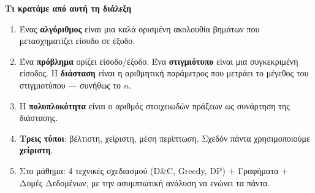 \documentclass[11pt,a4paper]{article}
\begin{document}
\begin{recapbox}
\textbf{Τι κρατάμε από αυτή τη διάλεξη}
\begin{enumerate}
  \item Ένας \textbf{αλγόριθμος} είναι μια καλά ορισμένη ακολουθία βημάτων που
  μετασχηματίζει είσοδο σε έξοδο.
  \item Ένα \textbf{πρόβλημα} ορίζει είσοδο/έξοδο. Ένα \textbf{στιγμιότυπο} είναι
  μια συγκεκριμένη είσοδος. Η \textbf{διάσταση} είναι η αριθμητική παράμετρος που
  μετράει το μέγεθος του στιγμιοτύπου --- συνήθως το $n$.
  \item Η \textbf{πολυπλοκότητα} είναι ο αριθμός στοιχειωδών πράξεων ως συνάρτηση
  της διάστασης.
  \item \textbf{Τρεις τύποι}: βέλτιστη, χείριστη, μέση περίπτωση. Σχεδόν πάντα
  χρησιμοποιούμε \textbf{χείριστη}.
  \item Στο μάθημα: 4 τεχνικές σχεδιασμού (D\&C, Greedy, DP) $+$ Γραφήματα $+$
  Δομές Δεδομένων, με την ασυμπτωτική ανάλυση να ενώνει τα πάντα.
\end{enumerate}
\end{recapbox}

\lecturefooter
\end{document}

